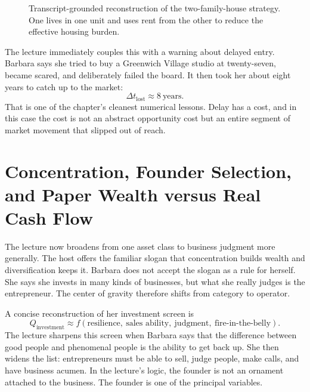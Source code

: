 \begin{figure}[h]
\centering
{}
\caption{Transcript-grounded reconstruction of the two-family-house strategy. One lives in one unit and uses rent from the other to reduce the effective housing burden.}
\end{figure}

The lecture immediately couples this with a warning about delayed entry. Barbara says she tried to buy a Greenwich Village studio at twenty-seven, became scared, and deliberately failed the board. It then took her about eight years to catch up to the market:
\begin{equation}
\Delta t_{\text{lost}}\approx 8\ \text{years}.
\end{equation}
That is one of the chapter's cleanest numerical lessons. Delay has a cost, and in this case the cost is not an abstract opportunity cost but an entire segment of market movement that slipped out of reach.

\section{Concentration, Founder Selection, and Paper Wealth versus Real Cash Flow}

The lecture now broadens from one asset class to business judgment more generally. The host offers the familiar slogan that concentration builds wealth and diversification keeps it. Barbara does not accept the slogan as a rule for herself. She says she invests in many kinds of businesses, but what she really judges is the entrepreneur. The center of gravity therefore shifts from category to operator.

A concise reconstruction of her investment screen is
\begin{equation}
Q_{\text{investment}}
\approx
f(\text{resilience},\ \text{sales ability},\ \text{judgment},\ \text{fire-in-the-belly}).
\end{equation}
The lecture sharpens this screen when Barbara says that the difference between good people and phenomenal people is the ability to get back up. She then widens the list: entrepreneurs must be able to sell, judge people, make calls, and have business acumen. In the lecture's logic, the founder is not an ornament attached to the business. The founder is one of the principal variables.

